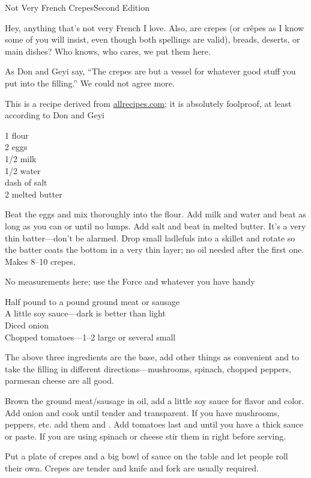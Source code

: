 
\begin{entry}{Not Very French Crepes}{Second Edition}

\begin{open}
    Hey, anything that's not very French I love.  Also, are crepes (or
    cr\^{e}pes as I know some of you will insist, even though both spellings are
    valid), breads, deserts, or main dishes?  Who knows, who cares, we put them
    here.

    As Don and Geyi say, ``The crepes are but a vessel for whatever good stuff
    you put into the filling.''  We could not agree more.

    This is a recipe derived from \url{allrecipes.com}; it is absolutely foolproof, at least according to Don and Geyi
\end{open}
\begin{ingredients}
    \SI{1}{\cup} flour\\
    2 eggs\\
    \SI{1/2}{\cup} milk\\
    \SI{1/2}{\cup} water\\
    dash of salt\\
    \SI{2}{\tblspoon} melted butter
\end{ingredients}
Beat the eggs and mix thoroughly into the flour. Add milk and water and beat as
long as you can or until no lumps. Add salt and beat in melted butter. It's a
very thin batter---don't be alarmed. Drop small ladlefuls into a skillet and
rotate so the batter coats the bottom in a very thin layer; no oil needed after
the first one. Makes \numrange{8}{10} crepes.


\noindent No measurements here; use the Force and whatever you have handy
\begin{ingredients}
    Half pound to a pound ground meat or sausage\\
    A little soy sauce---dark is better than light\\
    Diced onion\\
    Chopped tomatoes---\numrange{1}{2} large or several small
\end{ingredients}
The above three ingredients are the base, add other things as convenient and
to take the filling in different directions---mushrooms, spinach, chopped
peppers, parmesan cheese are all good.

Brown the ground meat/sausage in oil, add a little soy sauce for flavor and
color. Add onion and cook until tender and transparent. If you have mushrooms,
peppers, etc. add them and \saute. Add tomatoes last and \saute until you
have a thick sauce or paste. If you are using spinach or cheese stir them in
right before serving.

Put a plate of crepes and a big bowl of sauce on the table and let people roll
their own. Crepes are tender and knife and fork are usually required.
\end{entry}

